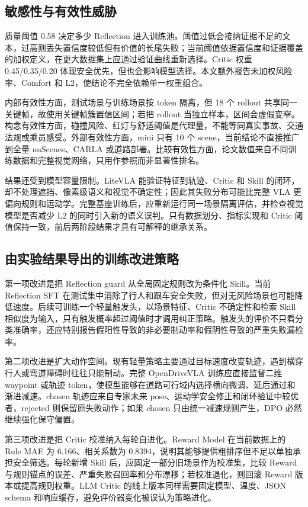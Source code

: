 \documentclass[UTF8,a4paper,12pt,fontset=fandol]{ctexart}
\begin{document}
\subsection{敏感性与有效性威胁}
质量阈值 0.58 决定多少 Reflection 进入训练池。阈值过低会接纳证据不足的文本，过高则丢失置信度较低但有价值的长尾失败；当前阈值依据置信度和证据覆盖的加权定义，在更大数据集上应通过验证曲线重新选择。Critic 权重 0.45/0.35/0.20 体现安全优先，但也会影响模型选择。本文额外报告未加权风险率、Comfort 和 L2，使结论不完全依赖单一权重组合。

内部有效性方面，测试场景与训练场景按 token 隔离，但 18 个 rollout 共享同一关键帧，故使用关键帧簇置信区间；若把 rollout 当独立样本，区间会虚假变窄。构念有效性方面，碰撞风险、红灯与舒适阈值是代理量，不能等同真实事故、交通法规或乘员感受。外部有效性方面，mini 只有 10 个 scene，当前结论不直接推广到全量 nuScenes、CARLA 或道路部署。比较有效性方面，论文数值来自不同训练数据和完整视觉网络，只用作参照而非显著性排名。

结果还受到模型容量限制。LiteVLA 能验证特征到轨迹、Critic 和 Skill 的闭环，却不处理遮挡、像素级语义和视觉不确定性；因此其失败分布可能比完整 VLA 更偏向规则和运动学。完整基座训练后，应重新运行同一场景隔离评估，并检查视觉模型是否减少 L2 的同时引入新的语义误判。只有数据划分、指标实现和 Critic 阈值保持一致，前后两阶段结果才具有可解释的继承关系。

\subsection{由实验结果导出的训练改进策略}
第一项改进是把 Reflection guard 从全局固定规则改为条件化 Skill。当前 Reflection SFT 在测试集中消除了行人和跟车安全失败，但对无风险场景也可能降低速度。后续可训练一个轻量触发头，以场景特征、Critic 不确定性和检索 Skill 相似度为输入，只有触发概率超过阈值时才调用纠正策略。触发头的评价不只看分类准确率，还应特别报告假阳性导致的非必要制动率和假阴性导致的严重失败漏检率。

第二项改进是扩大动作空间。现有轻量策略主要通过目标速度改变轨迹，遇到横穿行人或弯道障碍时往往只能制动。完整 OpenDriveVLA 训练应直接监督二维 waypoint 或轨迹 token，使模型能够在道路可行域内选择横向微调、延后通过和渐进减速。chosen 轨迹应来自专家未来 pose、运动学安全修正和闭环验证中较优者，rejected 则保留原失败动作；如果 chosen 只由统一减速规则产生，DPO 必然继续强化保守偏置。

第三项改进是把 Critic 校准纳入每轮自进化。Reward Model 在当前数据上的 Rule MAE 为 6.166、相关系数为 0.8394，说明其能够提供粗排序但不足以单独承担安全筛选。每轮新增 Skill 后，应固定一部分旧场景作为校准集，比较 Reward 与规则锚点的误差、严重失败召回率和分布漂移；若校准退化，则回滚 Reward 版本或提高规则权重。LLM Critic 的线上版本同样需要固定模型、温度、JSON schema 和响应缓存，避免评价器变化被误认为策略进化。
\end{document}
